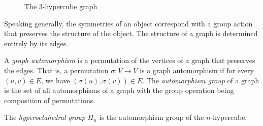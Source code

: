 \documentclass[cclicense]{hmcthesis}
\numberwithin{equation}{chapter}
\numberwithin{thmcounter}{chapter}
\begin{document}
    \begin{figure}[h]
        \centering


        \caption{The $3$-hypercube graph}
        \label{fig:hypercube}
    \end{figure}
    
    Speaking generally, the symmetries of an object correspond with a group
    action that preserves the structure of the object.  The structure of a graph
    is determined entirely by its edges.
    \begin{definition}
        A \emph{graph automorphism} is a permutation of the vertices of a graph
        that preserves the edges.  That is, a permutation $\sigma: V \to V$ is a
        graph automorphism if for every $(u, v) \in E$, we have $(\sigma(u),
        \sigma(v)) \in E$.
        The \emph{automorphism group} of a graph is the set of all
        automorphisms of a graph with the group operation being composition of
        permutations.
    \end{definition}

    \begin{definition}
        The \emph{hyperoctahedral group} $H_n$ is the automorphism group of the
        $n$-hypercube.
    \end{definition}
\end{document}
